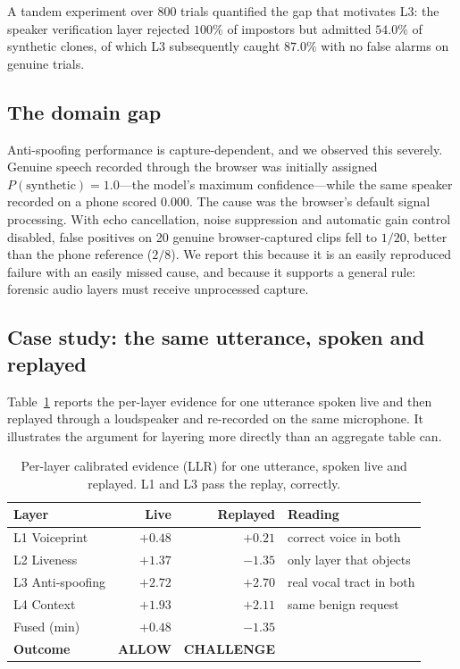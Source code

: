 \documentclass[conference]{IEEEtran}
\begin{document}
A tandem experiment over 800 trials quantified the gap that motivates L3: the
speaker verification layer rejected $100\%$ of impostors but admitted $54.0\%$
of synthetic clones, of which L3 subsequently caught $87.0\%$ with no false
alarms on genuine trials.

\subsection{The domain gap}
\label{sec:domaingap}

Anti-spoofing performance is capture-dependent, and we observed this severely.
Genuine speech recorded through the browser was initially assigned
$P(\text{synthetic})=1.0$---the model's maximum confidence---while the same
speaker recorded on a phone scored $0.000$. The cause was the browser's default
signal processing. With echo cancellation, noise suppression and automatic gain
control disabled, false positives on 20 genuine browser-captured clips fell to
$1/20$, better than the phone reference ($2/8$). We report this because it is
an easily reproduced failure with an easily missed cause, and because it
supports a general rule: forensic audio layers must receive unprocessed
capture.

\subsection{Case study: the same utterance, spoken and replayed}

Table~\ref{tab:case} reports the per-layer evidence for one utterance spoken
live and then replayed through a loudspeaker and re-recorded on the same
microphone. It illustrates the argument for layering more directly than an
aggregate table can.

\begin{table}[t]
\caption{Per-layer calibrated evidence (LLR) for one utterance, spoken live
and replayed. L1 and L3 pass the replay, correctly.}
\label{tab:case}
\centering
\footnotesize
\begin{tabular}{@{}lrrl@{}}
\toprule
\textbf{Layer} & \textbf{Live} & \textbf{Replayed} & \textbf{Reading} \\
\midrule
L1 Voiceprint    & $+0.48$ & $+0.21$ & correct voice in both \\
L2 Liveness      & $+1.37$ & $\mathbf{-1.35}$ & only layer that objects \\
L3 Anti-spoofing & $+2.72$ & $+2.70$ & real vocal tract in both \\
L4 Context       & $+1.93$ & $+2.11$ & same benign request \\
\midrule
Fused (min)      & $+0.48$ & $-1.35$ & \\
\textbf{Outcome} & \textbf{ALLOW} & \textbf{CHALLENGE} & \\
\bottomrule
\end{tabular}
\end{table}
\end{document}
